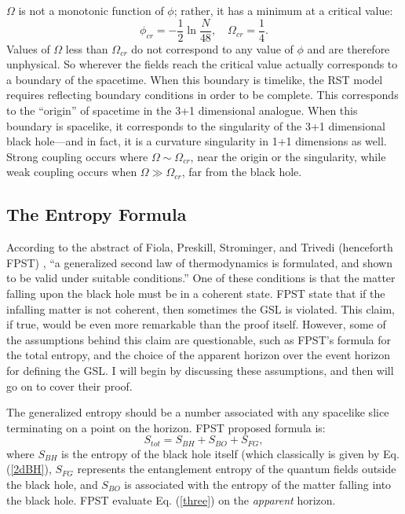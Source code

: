 \documentclass{article}
\begin{document}
$\Omega$ is not a monotonic function of $\phi$; rather, it has a minimum at a critical value:
\begin{equation}
\phi_{cr} = -\frac{1}{2}\ln \frac{N}{48},\quad \Omega_{cr} = \frac{1}{4}.
\end{equation}
Values of $\Omega$ less than $\Omega_{cr}$ do not correspond to any value of $\phi$ and are therefore unphysical.  So wherever the fields reach the critical value actually corresponds to a boundary of the spacetime.  When this boundary is timelike, the RST model requires reflecting boundary conditions in order to be complete.  This corresponds to the ``origin'' of spacetime in the 3+1 dimensional analogue.  When this boundary is spacelike, it corresponds to the singularity of the 3+1 dimensional black hole---and in fact, it is a curvature singularity in 1+1 dimensions as well.  Strong coupling occurs where $\Omega \sim \Omega_{cr}$, near the origin or the singularity, while weak coupling occurs when $\Omega \gg \Omega_{cr}$, far from the black hole.

\subsection{The Entropy Formula}

According to the abstract of Fiola, Preskill, Strominger, and Trivedi (henceforth FPST) \cite{fiola94}, ``a generalized second law of thermodynamics is formulated, and shown to be valid under suitable conditions.''  One of these conditions is that the matter falling upon the black hole must be in a coherent state.  FPST state that if the infalling matter is not coherent, then sometimes the GSL is violated.  This claim, if true, would be even more remarkable than the proof itself.  However, some of the assumptions behind this claim are questionable, such as FPST's formula for the total entropy, and the choice of the apparent horizon over the event horizon for defining the GSL.  I will begin by discussing these assumptions, and then will go on to cover their proof.

The generalized entropy should be a number associated with any spacelike slice terminating on a point on the horizon.  FPST proposed formula is:
\begin{equation}\label{three}
S_{tot} = S_{BH} + S_{BO} + S_{FG},
\end{equation}
where $S_{BH}$ is the entropy of the black hole itself (which classically is given by Eq. (\ref{2dBH}), $S_{FG}$ represents the entanglement entropy of the quantum fields outside the black hole, and $S_{BO}$ is associated with the entropy of the matter falling into the black hole.  FPST evaluate Eq. (\ref{three}) on the \emph{apparent} horizon.
\end{document}
